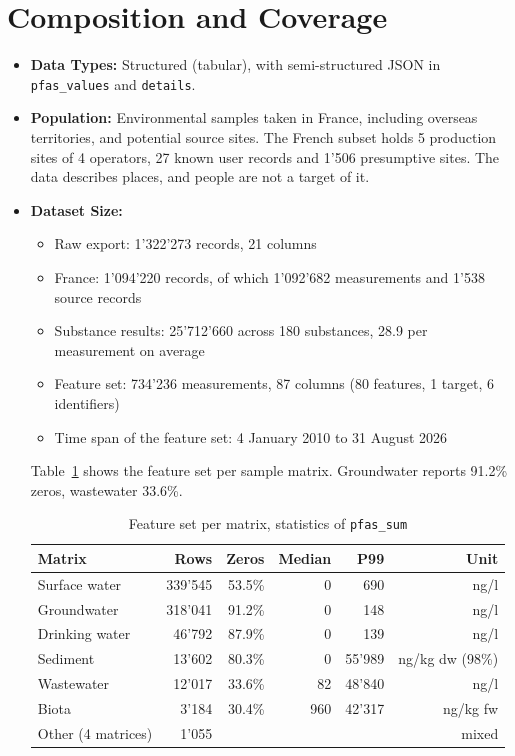 \documentclass[11pt, a4paper]{article}
\newcommand{\code}[1]{\texttt{#1}}
\begin{document}
\section{Composition and Coverage}
\begin{itemize}
    \item \textbf{Data Types:} Structured (tabular), with semi-structured JSON in \code{pfas\_values} and \code{details}.
    \item \textbf{Population:} Environmental samples taken in France, including overseas territories, and potential source sites. The French subset holds 5 production sites of 4 operators, 27 known user records and 1'506 presumptive sites. The data describes places, and people are not a target of it.
    \item \textbf{Dataset Size:}
    \begin{itemize}
        \item Raw export: 1'322'273 records, 21 columns
        \item France: 1'094'220 records, of which 1'092'682 measurements and 1'538 source records
        \item Substance results: 25'712'660 across 180 substances, 28.9 per measurement on average
        \item Feature set: 734'236 measurements, 87 columns (80 features, 1 target, 6 identifiers)
        \item Time span of the feature set: 4 January 2010 to 31 August 2026
    \end{itemize}
    Table~\ref{tab:matrix} shows the feature set per sample matrix. Groundwater reports 91.2\% zeros, wastewater 33.6\%.

    \begin{table}[h]
        \centering
        \small
        \begin{tabular}{l r r r r r}
            \toprule
            \textbf{Matrix} & \textbf{Rows} & \textbf{Zeros} & \textbf{Median} & \textbf{P99} & \textbf{Unit} \\
            \midrule
            Surface water & 339'545 & 53.5\% & 0 & 690 & ng/l \\
            Groundwater & 318'041 & 91.2\% & 0 & 148 & ng/l \\
            Drinking water & 46'792 & 87.9\% & 0 & 139 & ng/l \\
            Sediment & 13'602 & 80.3\% & 0 & 55'989 & ng/kg dw (98\%) \\
            Wastewater & 12'017 & 33.6\% & 82 & 48'840 & ng/l \\
            Biota & 3'184 & 30.4\% & 960 & 42'317 & ng/kg fw \\
            Other (4 matrices) & 1'055 & & & & mixed \\
            \bottomrule
        \end{tabular}
        \caption{Feature set per matrix, statistics of \code{pfas\_sum}}
        \label{tab:matrix}
    \end{table}


\end{itemize}
\end{document}
